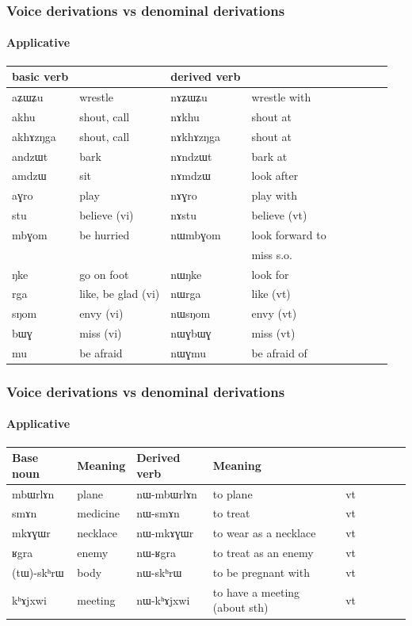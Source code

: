 \documentclass[xcolor=table]{beamer}
\newcommand{\ipa}[1]{{\phon \mbox{#1}}} %
\begin{document}
 \begin{frame} 
\frametitle{Voice derivations vs denominal derivations} 
\framesubtitle{Applicative} 
 
 \begin{tabular}{lllllllll} \toprule
basic verb  & &derived  verb &\\
\midrule
 \ipa{aʑɯʑu}  & wrestle	& \ipa{nɤʑɯʑu}  & wrestle with\\
\ipa{akhu}  &	shout, call&\ipa{nɤkhu}  & shout at \\
\ipa{akhɤzŋga}&	shout, call&\ipa{nɤkhɤzŋga}  & shout at \\
\ipa{andzɯt}  &	bark&\ipa{nɤndzɯt}  & bark at \\
\ipa{amdzɯ}  &sit & \ipa{nɤmdzɯ}  &look after\\
\ipa{aɣro}&play&\ipa{nɤɣro} & play with \\
    \ipa{stu}  &believe (vi)	& \ipa{nɤstu}  & believe (vt)\\
\midrule
\ipa{mbɣom}  &	be hurried & \ipa{nɯmbɣom}  & look  forward to\\
&&& miss s.o.\\
\ipa{ŋke}  &go on foot	& \ipa{nɯŋke}  & look for \\
\ipa{rga}  &	like, be glad (vi) & \ipa{nɯrga}  &like (vt) \\
\ipa{sŋom}  &	envy (vi) & \ipa{nɯsŋom}  &envy (vt) \\
\midrule
  \ipa{bɯɣ}  &miss (vi)	& \ipa{nɯɣbɯɣ}  & miss (vt)\\
  \ipa{mu} & be afraid & \ipa{nɯɣmu} & be afraid of \\
\bottomrule
\end{tabular}
\end{frame}    

 \begin{frame} 
\frametitle{Voice derivations vs denominal derivations} 
\framesubtitle{Applicative} 
\begin{tabular}{lllllllll} \toprule
Base noun& Meaning & Derived verb & Meaning & \\
\midrule
\ipa{mbɯrlɤn} &plane & \ipa{nɯ-mbɯrlɤn} &to plane    &vt\\
\ipa{smɤn} &medicine & \ipa{nɯ-smɤn} &to treat    &vt\\
\ipa{mkɤɣɯr} &necklace & \ipa{nɯ-mkɤɣɯr} &to wear as a necklace    &vt\\
\ipa{ʁgra} & enemy& \ipa{nɯ-ʁgra} & to treat as an enemy&vt\\
\ipa{(tɯ)-skʰrɯ} &body  & \ipa{nɯ-skʰrɯ} &to be pregnant with &vt\\
\ipa{kʰɤjxwi} & meeting&  \ipa{nɯ-kʰɤjxwi} & to have a meeting (about sth) & vt  \\
    \bottomrule
\end{tabular}
\end{frame}    
 
\end{document}
